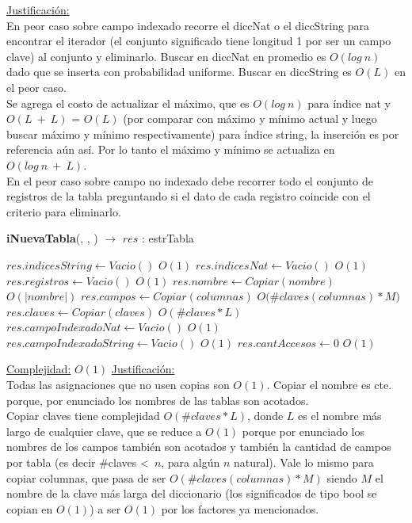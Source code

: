 \begin{Algoritmos}
\begin{algorithm}
\begin{algorithmic}
      \Statex \underline{Justificación:} {\\
\quad\quad En peor caso sobre campo indexado recorre el diccNat o el diccString para encontrar el iterador (el conjunto significado tiene longitud 1 por ser un campo clave) al conjunto y eliminarlo. Buscar en diccNat en promedio es $O(log\ n)$ dado que se inserta con probabilidad uniforme. Buscar en diccString es $O(L)$ en el peor caso. \\
\quad\quad Se agrega el costo de actualizar el máximo, que es $O(log\ n)$ para índice nat y $O(L\ +\ L)$ = $O(L)$ (por comparar con máximo y mínimo actual y luego buscar máximo y mínimo respectivamente) para índice string, la inserción es por referencia aún así. Por lo tanto el máximo y mínimo se actualiza en $O(log\ n\ +\ L)$. \\
\quad\quad En el peor caso sobre campo no indexado debe recorrer todo el conjunto de registros de la tabla preguntando si el dato de cada registro coincide con el criterio para eliminarlo.}
      \end{algorithmic}
\end{algorithm}

\begin{algorithm}[H]{\textbf{iNuevaTabla}(, , ) $\to$ $res$ : estrTabla}
  \begin{algorithmic}
    
    \State $res.indicesString \gets Vacio()$            \Comment $O(1)$
    \State $res.indicesNat \gets Vacio()$               \Comment $O(1)$
    \State $res.registros \gets Vacio()$                \Comment $O(1)$
    \State $res.nombre \gets Copiar(nombre)$            \Comment $O(|nombre|)$
    \State $res.campos \gets Copiar(columnas)$          \Comment $O\big(\#claves(columnas) * M\big)$
    \State $res.claves \gets Copiar(claves)$            \Comment $O(\#claves * L)$
    \State $res.campoIndexadoNat \gets Vacio()$         \Comment $O(1)$
    \State $res.campoIndexadoString \gets Vacio()$      \Comment $O(1)$
    \State $res.cantAccesos \gets 0$                    \Comment $O(1)$
    
    \medskip    
    \Statex \underline{Complejidad:} {$O(1)$}
    \Statex \underline{Justificación:} {\\
\quad\quad Todas las asignaciones que no usen copias son $O(1)$. Copiar el nombre es cte. porque, por enunciado los nombres de las tablas son acotados. \\ 
\quad\quad Copiar claves tiene complejidad $O(\#claves * L)$, donde $L$ es el nombre más largo de cualquier clave, que se reduce a $O(1)$ porque por enunciado los nombres de los campos también son acotados y también la cantidad de campos por tabla (es decir \#claves <\ $n$, para algún $n$ natural). Vale lo mismo para copiar columnas, que pasa de ser $O(\#claves(columnas) * M)$ siendo $M$ el nombre de la clave más larga del diccionario (los significados de tipo bool se copian en $O(1)$) a ser $O(1)$ por los factores ya mencionados.
  }
  \end{algorithmic}
\end{algorithm}


\end{Algoritmos}
